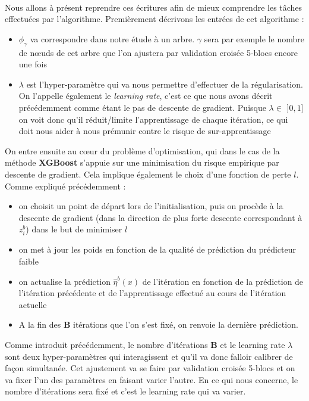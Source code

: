 \documentclass[14pt, openany]{article}
\begin{document}
\paragraph{}
Nous allons à présent reprendre ces écritures afin de mieux comprendre les tâches effectuées par l'algorithme. Premièrement décrivons les entrées de cet algorithme :
\begin{itemize}
\item $\phi_{\gamma}$ va correspondre dans notre étude à un arbre. $\gamma$ sera par exemple le nombre de nœuds de cet arbre que l'on ajustera par validation croisée 5-blocs encore une fois
\item $\lambda$ est l'hyper-paramètre qui va nous permettre d'effectuer de la régularisation. On l'appelle également le \textit{learning rate}, c'est ce que nous avons décrit précédemment comme étant le pas de descente de gradient. Puisque $\lambda \in$ $]0,1]$ on voit donc qu'il réduit/limite l'apprentissage de chaque itération, ce qui doit nous aider à nous prémunir contre le risque de sur-apprentissage
\end{itemize}
On entre ensuite au cœur du problème d'optimisation, qui dans le cas de la méthode \textbf{XGBoost} s'appuie sur une minimisation du risque empirique par descente de gradient. Cela implique également le choix d'une fonction de perte $l$. Comme expliqué précédemment :
\begin{itemize}
\item on choisit un point de départ lors de l'initialisation, puis on procède à la descente de gradient (dans la direction de plus forte descente correspondant à $z_{i}^b$) dans le but de minimiser $l$
\item on met à jour les poids en fonction de la qualité de prédiction du \og prédicteur faible \fg{}
\item on actualise la prédiction $\hat{\eta}^b(x)$ de l'itération en fonction de la prédiction de l'itération précédente et de l'apprentissage effectué au cours de l'itération actuelle
\item A la fin des \textbf{B} itérations que l'on s'est fixé, on renvoie la dernière prédiction.
\end{itemize}
Comme introduit précédemment, le nombre d'itérations \textbf{B} et le learning rate $\lambda$ sont deux hyper-paramètres qui interagissent et qu'il va donc falloir calibrer de façon simultanée. Cet ajustement va se faire par validation croisée 5-blocs et on va fixer l'un des paramètres en faisant varier l'autre. En ce qui nous concerne, le nombre d'itérations sera fixé et c'est le learning rate qui va varier.
\end{document}
